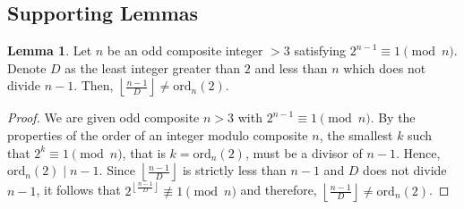 \documentclass{article}
\theoremstyle{plain}
\theoremstyle{definition}
\newtheorem{lemma}{Lemma}
\begin{document}
\subsection{Supporting Lemmas}
\begin{lemma}
\label{lemma:1}
    Let $n$ be an odd composite integer $> 3$ satisfying $2^{n-1} \equiv 1 \pmod{n}$. Denote $D$ as the least integer greater than $2$ and less than $n$ which does not divide $n-1$. Then, $\left\lfloor\frac{n-1}{D}\right\rfloor \not= \text{ord}_n(2)$.
\end{lemma}
\begin{proof}
We are given odd composite $n > 3$ with $2^{n-1} \equiv 1 \pmod{n}$. By the properties of the order of an integer modulo composite $n$, the smallest $k$ such that $2^k \equiv 1 \pmod{n}$, that is $k = \text{ord}_n(2)$, must be a divisor of $n-1$. Hence, $\text{ord}_n(2) \mid n-1$. Since $\left\lfloor\frac{n-1}{D}\right\rfloor$ is strictly less than $n-1$ and $D$ does not divide $n-1$, it follows that $2^{\left\lfloor\frac{n-1}{D}\right\rfloor} \not\equiv 1 \pmod{n}$ and therefore, $\left\lfloor\frac{n-1}{D}\right\rfloor \not= \text{ord}_n(2)$.
\end{proof}
\end{document}
